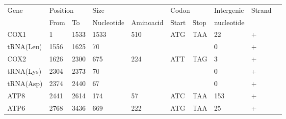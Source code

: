 \documentclass[../DISSERTACAO_MAIN.tex]{subfiles}
\begin{document}
\begin{longtable}{llllllllllllllllllllll}
			Gene         & \multicolumn{3}{l}{Position}               & \multicolumn{4}{l}{Size}                                       & \multicolumn{6}{l}{Codon}                                           & \multicolumn{3}{l}{Intergenic} & \multicolumn{3}{l}{Strand} & \multicolumn{2}{l}{} \\
			& From           & \multicolumn{2}{l}{To}    & \multicolumn{2}{l}{Nucleotide} & \multicolumn{2}{l}{Aminoacid} & \multicolumn{3}{l}{Start}               & \multicolumn{3}{l}{Stop}  & \multicolumn{3}{l}{nucleotide} & \multicolumn{3}{l}{}       & \multicolumn{2}{l}{} \\
			COX1         & 1              & \multicolumn{2}{l}{1533}  & \multicolumn{2}{l}{1533}       & \multicolumn{2}{l}{510}       & \multicolumn{3}{l}{ATG}                 & \multicolumn{3}{l}{TAA}   & \multicolumn{3}{l}{22}         & \multicolumn{3}{l}{+}      & \multicolumn{2}{l}{} \\
			tRNA(Leu)    & 1556           & \multicolumn{2}{l}{1625}  & \multicolumn{2}{l}{70}         & \multicolumn{2}{l}{}          & \multicolumn{3}{l}{}                    & \multicolumn{3}{l}{}      & \multicolumn{3}{l}{0}          & \multicolumn{3}{l}{+}      & \multicolumn{2}{l}{} \\
			COX2         & 1626           & \multicolumn{2}{l}{2300}  & \multicolumn{2}{l}{675}        & \multicolumn{2}{l}{224}       & \multicolumn{3}{l}{ATT}                 & \multicolumn{3}{l}{TAG}   & \multicolumn{3}{l}{3}          & \multicolumn{3}{l}{+}      & \multicolumn{2}{l}{} \\
			tRNA(Lys)    & 2304           & \multicolumn{2}{l}{2373}  & \multicolumn{2}{l}{70}         & \multicolumn{2}{l}{}          & \multicolumn{3}{l}{}                    & \multicolumn{3}{l}{}      & \multicolumn{3}{l}{0}          & \multicolumn{3}{l}{+}      & \multicolumn{2}{l}{} \\
			tRNA(Asp)    & 2374           & \multicolumn{2}{l}{2440}  & \multicolumn{2}{l}{67}         & \multicolumn{2}{l}{}          & \multicolumn{3}{l}{}                    & \multicolumn{3}{l}{}      & \multicolumn{3}{l}{0}          & \multicolumn{3}{l}{+}      & \multicolumn{2}{l}{} \\
			ATP8         & 2441           & \multicolumn{2}{l}{2614}  & \multicolumn{2}{l}{174}        & \multicolumn{2}{l}{57}        & \multicolumn{3}{l}{ATC}                 & \multicolumn{3}{l}{TAA}   & \multicolumn{3}{l}{153}        & \multicolumn{3}{l}{+}      & \multicolumn{2}{l}{} \\
			ATP6         & 2768           & \multicolumn{2}{l}{3436}  & \multicolumn{2}{l}{669}        & \multicolumn{2}{l}{222}       & \multicolumn{3}{l}{ATG}                 & \multicolumn{3}{l}{TAA}   & \multicolumn{3}{l}{25}         & \multicolumn{3}{l}{+}      & \multicolumn{2}{l}{} \\

\end{longtable}
\end{document}
